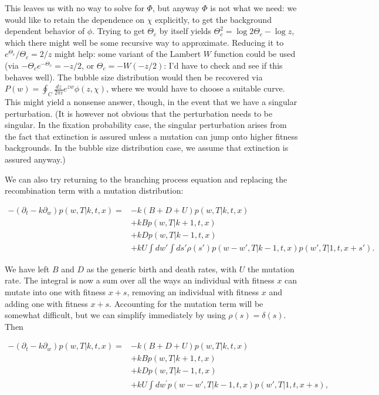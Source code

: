 \documentclass[10pt]{revtex4}
\begin{document}
This leaves us with no way to solve for $\Phi$, but anyway $\Phi$ is not what we need: we would like to retain the dependence on $\chi$ explicitly, to get the background dependent behavior of $\phi$.
Trying to get $\Theta_c$ by itself yields $\Theta_c^2 = \log 2\Theta_c - \log z$, which there might well be some recursive way to approximate.
Reducing it to $e^{\Theta_c}/\Theta_c = 2/z$ might help: some variant of the Lambert $W$ function could be used (via $-\Theta_c e^{-\Theta_c} = -z/2$, or $\Theta_c = -W(-z/2)$: I'd have to check and see if this behaves well).
The bubble size distribution would then be recovered via $P(w) = \oint_C \frac{dz}{2\pi i} e^{zw} \phi(z,\chi)$, where we would have to choose a suitable curve.
This might yield a nonsense answer, though, in the event that we have a singular perturbation.
(It is however not obvious that the perturbation needs to be singular.
In the fixation probability case, the singular perturbation arises from the fact that extinction is assured unless a mutation can jump onto higher fitness backgrounds.
In the bubble size distribution case, we assume that extinction is assured anyway.)

We can also try returning to the branching process equation and replacing the recombination term with a mutation distribution:

\begin{align*}
-(\partial_t -k\partial_w) p(w,T|k,t,x) = &-k(B+D+U)p(w,T|k,t,x) \\
& + kBp(w,T|k+1,t,x) \\
& +kDp(w,T|k-1,t,x) \\
&+kU \int dw\prime \int ds\prime \rho(s\prime) p(w-w\prime , T|k-1, t, x) p(w\prime,T|1,t,x+s\prime).
\end{align*}

We have left $B$ and $D$ as the generic birth and death rates, with $U$ the mutation rate.
The integral is now a sum over all the ways an individual with fitness $x$ can mutate into one with fitness $x+s$, removing an individual with fitness $x$ and adding one with fitness $x+s$.
Accounting for the mutation term will be somewhat difficult, but we can simplify immediately by using $\rho(s) = \delta(s)$. Then

\begin{align*}
-(\partial_t -k\partial_w) p(w,T|k,t,x) = &-k(B+D+U)p(w,T|k,t,x) \\
& + kBp(w,T|k+1,t,x) \\
& +kDp(w,T|k-1,t,x) \\
&+kU \int dw^\prime p(w-w\prime , T|k-1, t, x) p(w\prime,T|1,t,x+s),
\end{align*}
\end{document}
